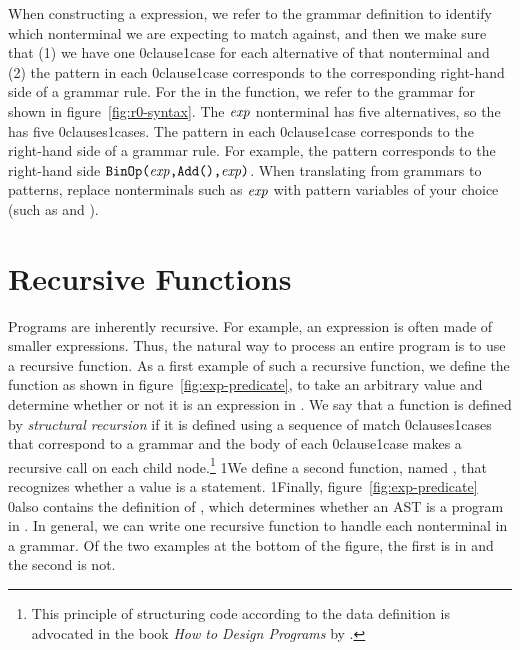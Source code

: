 \documentclass[7x10]{TimesAPriori_MIT}%
\def\racketEd{0}
\def\pythonEd{1}
\def\edition{1}
\newcommand{\racket}[1]{{\if\edition\racketEd{#1}\fi}}
\newcommand{\pythonColor}[0]{}
\newcommand{\python}[1]{{\if\edition\pythonEd\pythonColor #1\fi}}
\numberwithin{theorem}{chapter}
\numberwithin{definition}{chapter}
\numberwithin{equation}{chapter}
\begin{document}
When constructing a  expression, we refer to the grammar
definition to identify which nonterminal we are expecting to match
against, and then we make sure that (1) we have one
\racket{clause}\python{case} for each alternative of that nonterminal
and (2) the pattern in each \racket{clause}\python{case}
corresponds to the corresponding right-hand side of a grammar
rule. For the  in the  function, we refer to
the grammar for \LangInt{} shown in figure~\ref{fig:r0-syntax}. The $\mathit{exp}$
nonterminal has five alternatives, so the  has five
\racket{clauses}\python{cases}.  The pattern in each
\racket{clause}\python{case} corresponds to the right-hand side of a
grammar rule. For example, the pattern 
corresponds to the right-hand side ${\texttt{BinOp}\texttt{(} \mathit{exp}\texttt{,}\texttt{Add()}\texttt{,}\mathit{exp}\texttt{)}}$. When
translating from grammars to patterns, replace nonterminals such as
$\mathit{exp}$ with pattern variables of your choice (such as  and
).


\section{Recursive Functions}
\label{sec:recursion}

Programs are inherently recursive. For example, an expression is often
made of smaller expressions. Thus, the natural way to process an
entire program is to use a recursive function.  As a first example of
such a recursive function, we define the function  as
shown in figure~\ref{fig:exp-predicate}, to take an arbitrary
value and determine whether or not it is an expression in \LangInt{}.
%
We say that a function is defined by \emph{structural recursion} if
it is defined using a sequence of match \racket{clauses}\python{cases}
that correspond to a grammar and the body of each
\racket{clause}\python{case} makes a recursive call on each child
node.\footnote{This principle of structuring code according to the
  data definition is advocated in the book \emph{How to Design
    Programs} by \citet{Felleisen:2001aa}.}  \python{We define a
  second function, named , that recognizes whether a value
  is a \LangInt{} statement.}  \python{Finally, }
figure~\ref{fig:exp-predicate} \racket{also} contains the definition of
, which determines whether an AST is a program in \LangInt{}.
In general, we can write one recursive function to handle each
nonterminal in a grammar. Of the
two examples at the bottom of the figure, the first is in
\LangInt{} and the second is not.
\end{document}
